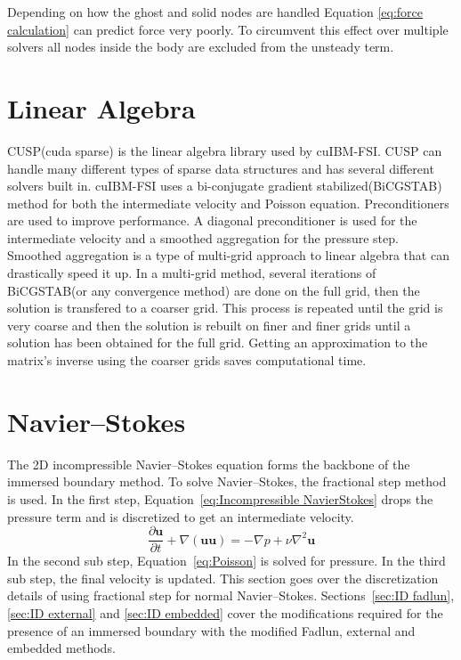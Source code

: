 Depending on how the ghost and solid nodes are handled Equation \eqref{eq:force calculation} can predict force very poorly.
To circumvent this effect over multiple solvers all nodes inside the body are excluded from the unsteady term.

\section{Linear Algebra}
\label{Preconditioning and Linear Algebra Solvers}
CUSP(cuda sparse) is the linear algebra library used by cuIBM-FSI. 
CUSP can handle many different types of sparse data structures and has several different solvers built in. 
cuIBM-FSI uses a bi-conjugate gradient stabilized(BiCGSTAB) method for both the intermediate velocity and Poisson equation. 
Preconditioners are used to improve performance. 
A diagonal preconditioner is used for the intermediate velocity and a smoothed aggregation for the pressure step. 
Smoothed aggregation is a type of multi-grid approach to linear algebra that can drastically speed it up. 
In a multi-grid method, several iterations of BiCGSTAB(or any convergence method) are done on the full grid, then the solution is transfered to a coarser grid. 
This process is repeated until the grid is very coarse and then the solution is rebuilt on finer and finer grids until a solution has been obtained for the full grid. 
Getting an approximation to the matrix's inverse using the coarser grids saves computational time. 
\section{Navier--Stokes}
\label{ID:Navier Stokes}

The 2D incompressible Navier--Stokes equation forms the backbone of the immersed boundary method. 
To solve Navier--Stokes, the fractional step method is used. 
In the first step, Equation~\eqref{eq:Incompressible NavierStokes} drops the pressure term and is discretized to get an intermediate velocity. 
\begin{equation}
\frac{\partial \textbf{u}}{\partial t} + \nabla ( \textbf{uu} ) = -\nabla p + \nu\nabla^{2}\textbf{u} \label{eq:Incompressible NavierStokes}
\end{equation}
In the second sub step, Equation~\eqref{eq:Poisson} is solved for pressure. 
In the third sub step, the final velocity is updated. 
This section goes over the discretization details of using fractional step for normal Navier--Stokes. 
Sections~\ref{sec:ID fadlun}, \ref{sec:ID external} and \ref{sec:ID embedded} cover the modifications required for the presence of an immersed boundary with the modified Fadlun, external and embedded methods. 

